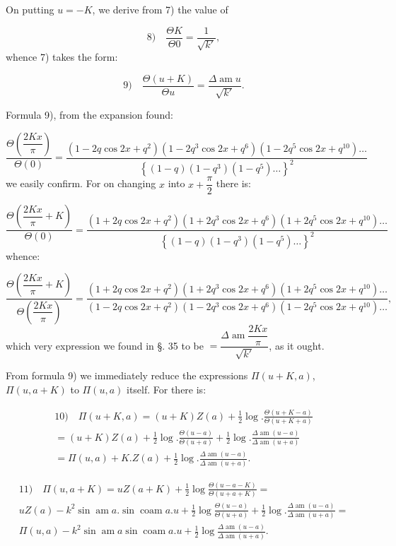 \documentclass{article}
\begin{document}
On putting $u=-K$, we derive from 7) the value of

\[
\text{8)}\quad \frac{\Theta K}{\Theta0}=\frac{1}{\sqrt{k'}},
\]
whence 7) takes the form:

\[
\text{9)}\quad \frac{\Theta(u+K)}{\Theta u}=\frac{\Delta\operatorname{am}u}{\sqrt{k'}}.
\]

Formula 9), from the expansion found:

\[
\frac{\Theta\left(\dfrac{2Kx}{\pi}\right)}{\Theta(0)}=\frac{(1-2q\cos2x+q^{2})(1-2q^{3}\cos2x+q^{6})(1-2q^{5}\cos2x+q^{10})\ldots}{\left\{(1-q)(1-q^{3})(1-q^{5})\ldots\right\}^{2}}
\]
we easily confirm. For on changing $x$ into $x+\dfrac{\pi}{2}$ there is:

\[
\frac{\Theta\left(\dfrac{2Kx}{\pi}+K\right)}{\Theta(0)}=\frac{(1+2q\cos2x+q^{2})(1+2q^{3}\cos2x+q^{6})(1+2q^{5}\cos2x+q^{10})\ldots}{\left\{(1-q)(1-q^{3})(1-q^{5})\ldots\right\}^{2}}
\]
whence:

\[
\frac{\Theta\left(\dfrac{2Kx}{\pi}+K\right)}{\Theta\left(\dfrac{2Kx}{\pi}\right)}=\frac{(1+2q\cos2x+q^{2})(1+2q^{3}\cos2x+q^{6})(1+2q^{5}\cos2x+q^{10})\ldots}{(1-2q\cos2x+q^{2})(1-2q^{3}\cos2x+q^{6})(1-2q^{5}\cos2x+q^{10})\ldots},
\]
which very expression we found in §. 35 to be $=\dfrac{\Delta\operatorname{am}\dfrac{2Kx}{\pi}}{\sqrt{k'}}$, as it ought.

From formula 9) we immediately reduce the expressions $\Pi(u+K,a)$, $\Pi(u,a+K)$ to $\Pi(u,a)$ itself. For there is:

\[
\begin{gathered}
\text{10)}\quad \Pi(u+K,a)=(u+K)Z(a)+\frac{1}{2}\log.\frac{\Theta(u+K-a)}{\Theta(u+K+a)}\\[1.5ex]
=(u+K)Z(a)+\frac{1}{2}\log.\frac{\Theta(u-a)}{\Theta(u+a)}+\frac{1}{2}\log.\frac{\Delta\operatorname{am}(u-a)}{\Delta\operatorname{am}(u+a)}\\[1.5ex]
=\Pi(u,a)+K.Z(a)+\frac{1}{2}\log.\frac{\Delta\operatorname{am}(u-a)}{\Delta\operatorname{am}(u+a)}.
\end{gathered}
\]

\[
\begin{gathered}
\text{11)}\quad \Pi(u,a+K)=uZ(a+K)+\frac{1}{2}\log\frac{\Theta(u-a-K)}{\Theta(u+a+K)}=\\[1.5ex]
uZ(a)-k^{2}\sin\operatorname{am}a.\sin\operatorname{coam}a.u+\frac{1}{2}\log\frac{\Theta(u-a)}{\Theta(u+a)}+\frac{1}{2}\log.\frac{\Delta\operatorname{am}(u-a)}{\Delta\operatorname{am}(u+a)}=\\[1.5ex]
\Pi(u,a)-k^{2}\sin\operatorname{am}a\sin\operatorname{coam}a.u+\frac{1}{2}\log\frac{\Delta\operatorname{am}(u-a)}{\Delta\operatorname{am}(u+a)}.
\end{gathered}
\]
\end{document}
